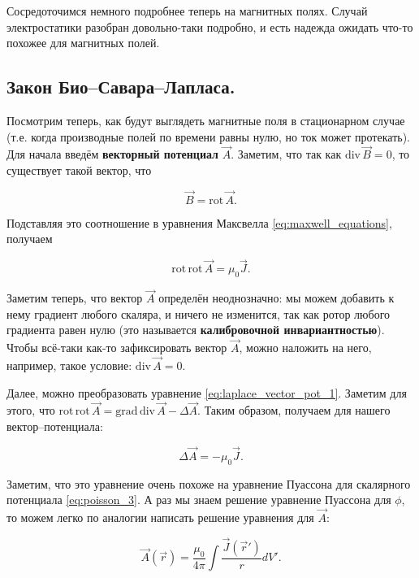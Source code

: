 \documentclass[11pt,a4paper]{article}
\numberwithin{equation}{section}
\newcommand{\grad}{\mathrm{grad}\,}
\newcommand{\rot}{\mathrm{rot}\,}
\renewcommand{\div}{\mathrm{div}\,}
\begin{document}
Сосредоточимся немного подробнее теперь на магнитных полях. Случай
электростатики разобран довольно-таки подробно, и есть надежда ожидать
что-то похожее для магнитных полей. 

\subsection{Закон Био--Савара--Лапласа.}
\label{sec:biot-savart-laplace}

Посмотрим теперь, как будут выглядеть магнитные поля в стационарном
случае (т.е. когда производные полей по времени равны нулю, но ток
может протекать). Для начала введём \textbf{векторный потенциал}
$\vec{A}$. Заметим, что так как $\div \vec{B} = 0$, то существует
такой вектор, что 

\begin{equation}
  \label{eq:def_vector_potential}
  \vec{B} = \rot \vec{A}.
\end{equation}

Подставляя это соотношение в уравнения Максвелла
\eqref{eq:maxwell_equations}, получаем 

\begin{equation}
  \label{eq:laplace_vector_pot_1}
  \rot \rot \vec{A} = \mu_0 \vec{J}.
\end{equation}

Заметим теперь, что вектор $\vec{A}$ определён неоднозначно: мы можем
добавить к нему градиент любого скаляра, и ничего не изменится, так
как ротор любого градиента равен нулю (это называется
\textbf{калибровочной инвариантностью}). Чтобы всё-таки как-то
зафиксировать вектор $\vec{A}$, можно наложить на него, например,
такое условие: $\div \vec{A} = 0$.

Далее, можно преобразовать уравнение
\eqref{eq:laplace_vector_pot_1}. Заметим для этого, что $\rot \rot
\vec{A} = \grad \div \vec{A} - \Delta \vec{A}$. Таким образом,
получаем для нашего вектор--потенциала: 

\begin{equation}
  \label{eq:laplace_vector_pot_2}
  \Delta \vec{A} = - \mu_0 \vec{J}. 
\end{equation}

Заметим, что это уравнение очень похоже на уравнение Пуассона для
скалярного потенциала \eqref{eq:poisson_3}. А раз мы знаем решение
уравнение Пуассона для $\phi$, то можем легко по аналогии написать
решение уравнения для $\vec{A}$: 

\begin{equation}
  \label{eq:solution_vector_pot}
  \vec{A}(\vec{r}) = \frac{\mu_0}{4\pi} \int \frac{\vec{J}(\vec{r}')}{r} dV'.
\end{equation}
\end{document}

